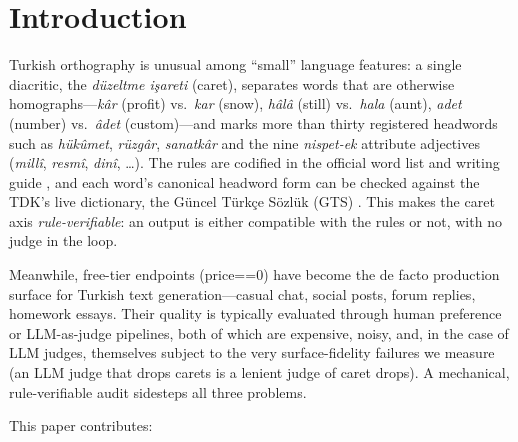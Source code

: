 \documentclass[11pt]{article}
\begin{document}
\section{Introduction}

Turkish orthography is unusual among ``small'' language features: a single diacritic, the \emph{d{\"u}zeltme i{\c s}areti} (caret), separates words that are otherwise homographs---\emph{k{\^a}r} (profit) vs.\ \emph{kar} (snow), \emph{h{\^a}l{\^a}} (still) vs.\ \emph{hala} (aunt), \emph{adet} (number) vs.\ \emph{{\^a}det} (custom)---and marks more than thirty registered headwords such as \emph{h{\"u}k{\^u}met}, \emph{r{\"u}zg{\^a}r}, \emph{sanatk{\^a}r} and the nine \emph{nispet-ek} attribute adjectives (\emph{mill{\^i}}, \emph{resm{\^i}}, \emph{din{\^i}}, \ldots). The rules are codified in the official word list and writing guide \cite{tdk2012}, and each word's canonical headword form can be checked against the TDK's live dictionary, the G{\"u}ncel T{\"u}rk{\c c}e S{\"o}zl{\"u}k (GTS) \cite{gts2026}. This makes the caret axis \emph{rule-verifiable}: an output is either compatible with the rules or not, with no judge in the loop.

Meanwhile, free-tier endpoints (price==0) have become the de facto production surface for Turkish text generation---casual chat, social posts, forum replies, homework essays. Their quality is typically evaluated through human preference or LLM-as-judge pipelines, both of which are expensive, noisy, and, in the case of LLM judges, themselves subject to the very surface-fidelity failures we measure (an LLM judge that drops carets is a lenient judge of caret drops). A mechanical, rule-verifiable audit sidesteps all three problems.

This paper contributes:
\end{document}
